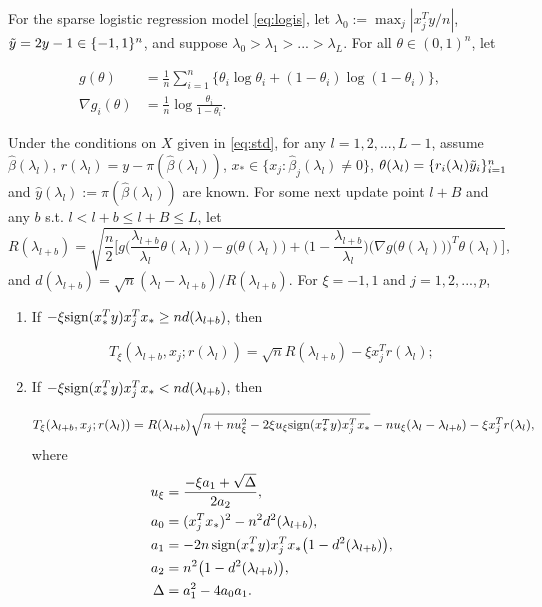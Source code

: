 \begin{theorem}
For the sparse logistic regression model \eqref{eq:logis}, let $\lambda_0:=\max_j|x_j^Ty/n|$, $\Tilde{y}=2y-1\in\{-1,1\}^n$, and suppose $\lambda_0>\lambda_1>...>\lambda_L$. For all $\theta\in(0,1)^n$, let 

\begin{equation}
    \begin{split}
        g(\theta)&=\frac{1}{n}\sum_{i=1}^n\{\theta_i\log \theta_i+(1-\theta_i)\log(1-\theta_i)\},\\
    \nabla g_i(\theta) &= \frac{1}{n}\log\frac{\theta_i}{1-\theta_i}.
    \end{split}
\end{equation}

Under the conditions on $X$ given in \eqref{eq:std}, for any $l=1,2,...,L-1$, assume $\hat{\beta}(\lambda_l)$, $r(\lambda_l)=y-\pi(\hat{\beta}(\lambda_l))$, $x_*\in\{x_j:\hat{\beta}_j(\lambda_l)\neq0\} $, $\theta(\lambda_l)=\{r_i(\lambda_l)\Tilde{y}_i\}_{i=1}^n$ and $\hat{y}(\lambda_l):=\pi(\hat{\beta}(\lambda_l))$ are known. For some next update point $l+B$ and any $b$ s.t. $l<l+b\leq l+B\leq L$, let
\begin{equation}
  R(\lambda_{l+b}) = \sqrt{\frac{n}{2} \bigg[g\bigg(\frac{\lambda_{l+b}}{\lambda_l}\theta(\lambda_l)\bigg) - g\bigg(\theta(\lambda_l)\bigg) + \bigg(1 - \frac{\lambda_{l+b}}{\lambda_l}\bigg) \bigg(\nabla g\big(\theta(\lambda_l)\big)\bigg)^T\theta(\lambda_l)\bigg]},
\end{equation}
and $d(\lambda_{l+b})=\sqrt{n}(\lambda_l-\lambda_{l+b})/R(\lambda_{l+b})$. For $\xi = -1,1$ and $j=1,2,...,p$,

\begin{enumerate}
    \item If $-\xi \textrm{sign}(x_*^Ty)x_j^Tx_*\geq nd(\lambda_{l+b})$, then
    
    \begin{equation}
        T_\xi(\lambda_{l+b},x_j;r(\lambda_l))=\sqrt{n}R(\lambda_{l+b})-\xi x_j^Tr(\lambda_l);
    \end{equation}
    
    \item If $-\xi \textrm{sign}(x_*^Ty)x_j^Tx_*< nd(\lambda_{l+b})$, then
    
    \begin{equation}
        T_\xi(\lambda_{l+b},x_j;r(\lambda_l))=R(\lambda_{l+b})\sqrt{n+nu_\xi^2-2\xi u_\xi \textrm{sign}(x_*^Ty)x_j^Tx_*}-nu_\xi(\lambda_l-\lambda_{l+b})-\xi x_j^Tr(\lambda_l),
    \end{equation}
    where
    \begin{align}
        u_\xi&=\frac{-\xi a_1+\sqrt{\Delta}}{2a_2},\\
        a_0&=(x_j^Tx_*)^2-n^2d^2(\lambda_{l+b}),\nonumber\\
        a_1&=-2n\,\textrm{sign}(x_*^Ty)x_j^Tx_*\big(1-d^2(\lambda_{l+b})\big),\nonumber\\
        a_2&=n^2\big(1-d^2(\lambda_{l+b})\big),\nonumber\\
        \Delta&=a_1^2-4a_0a_1.\nonumber
    \end{align}
\end{enumerate}


\end{theorem}
